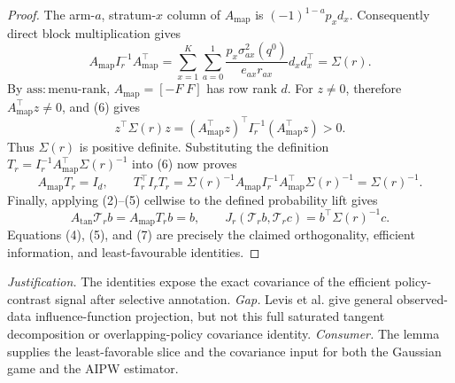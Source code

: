 \documentclass{article}
\begin{document}
\begin{proof}
The arm-\(a\), stratum-\(x\) column of \(A_{\mathrm{map}}\) is \((-1)^{1-a}p_xd_x\).  Consequently direct block multiplication gives
\[
 A_{\mathrm{map}}I_r^{-1}A_{\mathrm{map}}^\top
 =\sum_{x=1}^K\sum_{a=0}^1
 \frac{p_x\sigma^2_{ax}(q^0)}{e_{ax}r_{ax}}d_xd_x^\top
 =\Sigma(r).                                                         \tag{6}
\]
By \(\mathrm{ass:menu\text{-}rank}\), \(A_{\mathrm{map}}=[-F\;F]\) has row rank \(d\).  For \(z\neq0\), therefore \(A_{\mathrm{map}}^\top z\neq0\), and (6) gives
\[
 z^\top\Sigma(r)z=(A_{\mathrm{map}}^\top z)^\top I_r^{-1}
 (A_{\mathrm{map}}^\top z)>0.
\]
Thus \(\Sigma(r)\) is positive definite.  Substituting the definition
\(T_r=I_r^{-1}A_{\mathrm{map}}^\top\Sigma(r)^{-1}\) into (6) now proves
\[
 A_{\mathrm{map}}T_r=I_d,\qquad
 T_r^\top I_rT_r
 =\Sigma(r)^{-1}A_{\mathrm{map}}I_r^{-1}A_{\mathrm{map}}^\top
   \Sigma(r)^{-1}
 =\Sigma(r)^{-1}.                                                     \tag{7}
\]
Finally, applying (2)--(5) cellwise to the defined probability lift gives
\[
 A_{\mathrm{tan}}\mathcal T_rb=A_{\mathrm{map}}T_rb=b,\qquad
 J_r(\mathcal T_rb,\mathcal T_rc)=b^\top\Sigma(r)^{-1}c.              \tag{8}
\]
Equations (4), (5), and (7) are precisely the claimed orthogonality, efficient information, and least-favourable identities.
\end{proof}
\par\smallskip\noindent \textit{Justification.} The identities expose the exact covariance of the efficient policy-contrast signal after selective annotation. \textit{Gap.} Levis et al. give general observed-data influence-function projection, but not this full saturated tangent decomposition or overlapping-policy covariance identity. \textit{Consumer.} The lemma supplies the least-favorable slice and the covariance input for both the Gaussian game and the AIPW estimator.
\end{document}
